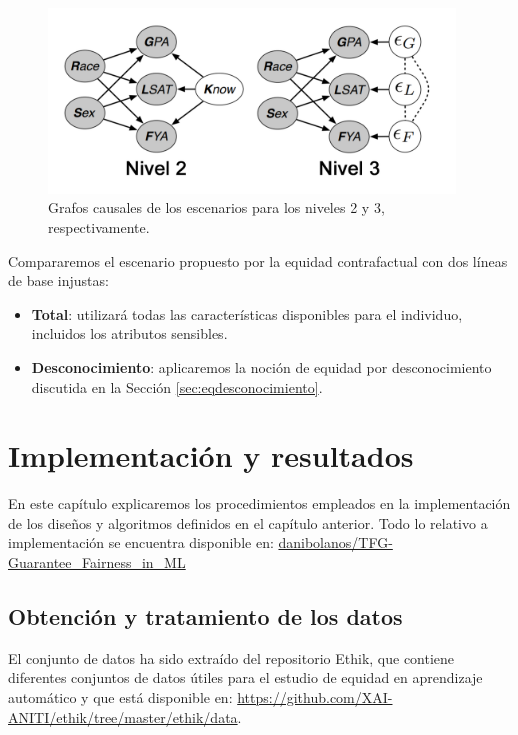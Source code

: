 \documentclass[oneside,openright,titlepage,numbers=noenddot,openany,headinclude,footinclude=true,
cleardoublepage=empty,abstractoff,BCOR=5mm,paper=a4,fontsize=12pt,main=spanish]{scrreprt}
\begin{document}
\begin{figure}[h]
	\centering
	\includegraphics[width=10.8cm]{causales_pract.png}
	\caption{Grafos causales de los escenarios para los niveles 2 y 3, respectivamente.}
    \label{fig:practicausales}
\end{figure}

Compararemos el escenario propuesto por la equidad contrafactual con dos líneas de base injustas: 

\begin{itemize}
    \item \textbf{Total}: utilizará todas las características disponibles para el individuo, incluidos los atributos sensibles.
    \item \textbf{Desconocimiento}: aplicaremos la noción de equidad por desconocimiento discutida en la Sección \ref{sec:eqdesconocimiento}.
\end{itemize} 

\chapter{Implementación y resultados} \label{ch:implementaresult}

En este capítulo explicaremos los procedimientos empleados en la implementación de los diseños y algoritmos definidos en el capítulo anterior. Todo lo relativo a implementación se encuentra disponible en: \href{https://github.com/danibolanos/TFG-Guarantee_Fairness_in_ML.git}{danibolanos/TFG-Guarantee\_Fairness\_in\_ML}

\section{Obtención y tratamiento de los datos}

El conjunto de datos ha sido extraído del repositorio Ethik, que contiene diferentes conjuntos de datos útiles para el estudio de equidad en aprendizaje automático y que está disponible en: \url{https://github.com/XAI-ANITI/ethik/tree/master/ethik/data}.
\end{document}
